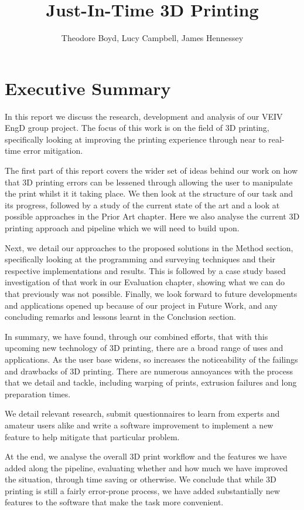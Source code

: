 \documentclass[11pt]{article} %
\title{Just-In-Time 3D Printing}
\author{Theodore Boyd, Lucy Campbell, James Hennessey}
\date{} %
\begin{document}
\maketitle

\section{Executive Summary}
In this report we discuss the research, development and analysis of our VEIV EngD group project. The focus of this work is on the field of 3D printing, specifically looking at improving the printing experience through near to real-time error mitigation.

The first part of this report covers the wider set of ideas behind our work on how that 3D printing errors can be lessened through allowing the user to manipulate the print whilst it it taking place. We then look at the structure of our task and its progress, followed by a study of the current state of the art and a look at possible approaches in the Prior Art chapter. Here we also analyse the current 3D printing approach and pipeline which we will need to build upon.

Next, we detail our approaches to the proposed solutions in the Method section, specifically looking at the programming and surveying techniques and their respective implementations and results. This is followed by a case study based investigation of that work in our Evaluation chapter, showing what we can do that previously was not possible.
Finally, we look forward to future developments and applications opened up because of our project in Future Work, and any concluding remarks and lessons learnt in the Conclusion section.

In summary, we have found, through our combined efforts, that with this upcoming new technology of 3D printing, there are a broad range of uses and applications. As the user base widens, so increases the noticeability of the failings and drawbacks of 3D printing. There are numerous annoyances with the process that we detail and tackle, including warping of prints, extrusion failures and long preparation times.

We detail relevant research, submit questionnaires to learn from experts and amateur users alike and write a software improvement to implement a new feature to help mitigate that particular problem.

At the end, we analyse the overall 3D print workflow and the features we have added along the pipeline, evaluating whether and how much we have improved the situation, through time saving or otherwise. We conclude that while 3D printing is still a fairly error-prone process, we have added substantially new features to the software that make the task more convenient.
\end{document}
